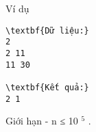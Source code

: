 Ví dụ
\begin{verbatim}
\textbf{Dữ liệu:}
2
2 11
11 30

\textbf{Kết quả:}
2 1
\end{verbatim}
Giới hạn
- n ≤ 10   $^    5   $   .